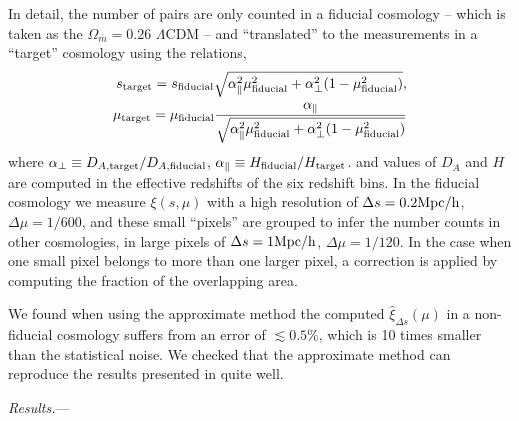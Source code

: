 \documentclass[prl,twocolumn,superscriptaddress,aps,amsmath,amssymb,nofootinbib,altaffilletter]{revtex4}
\begin{document}
In detail, the number of pairs are only counted in a fiducial cosmology
-- which is taken as the $\Omega_m=0.26$ $\Lambda$CDM --
and ``translated'' to the measurements in a ``target'' cosmology using the relations, 
\begin{eqnarray}
 s_{\rm target} = s_{\rm fiducial} \sqrt{\alpha_{\parallel}^2 \mu_{\rm fiducial}^2+\alpha_{\bot}^2(1-\mu_{\rm fiducial}^2)}, \\
 \mu_{\rm target} = \mu_{\rm fiducial} \frac{\alpha_\parallel}
 {\sqrt{\alpha_{\parallel}^2 \mu_{\rm fiducial}^2 +\alpha_{\bot}^2(1-\mu_{\rm fiducial}^2)}}
\end{eqnarray}
where $\alpha_{\bot}\equiv D_{A,\rm target}/D_{A,\rm fiducial}$,
$\alpha_{\parallel}\equiv H_{\rm fiducial}/H_{\rm target}$.
and values of $D_A$ and $H$ are computed in the effective redshifts of the six redshift bins.
In the fiducial cosmology
we measure $\xi(s,\mu)$ with a high resolution of
$\Delta s = 0.2 {\rm Mpc/h}$, $\Delta \mu = 1/600$,
and these small ``pixels'' are grouped to infer 
the number counts in other cosmologies, 
in large pixels of $\Delta s = 1 {\rm Mpc/h}$, $\Delta \mu = 1/120$.
In the case when one small pixel belongs to more than one larger pixel,
a correction is applied by computing the fraction of the overlapping area.

We found when using the approximate method the computed 
$\hat\xi_{\Delta s}(\mu)$ in a non-fiducial cosmology suffers from
an error of $\lesssim0.5\%$, which is 10 times smaller than the statistical noise.
We checked that the approximate method can reproduce the results presented in \cite{Li2016} quite well.


{\it Results.}---
\end{document}

